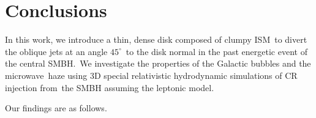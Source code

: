 \documentclass[twocolumn]{aastex631}
\begin{document}
%
%
%
%
%



\section{Conclusions}
\label{Conclusions}
In this work, we introduce a thin, dense disk composed of clumpy ISM\
to divert the oblique jets at an angle $45^{\circ}$\
to the disk normal in the past energetic event of the central SMBH.\
We investigate the properties of the Galactic bubbles and the microwave\
haze using 3D special relativistic hydrodynamic simulations of CR injection from\
the SMBH assuming the leptonic model.


Our findings are as follows.
\end{document}
